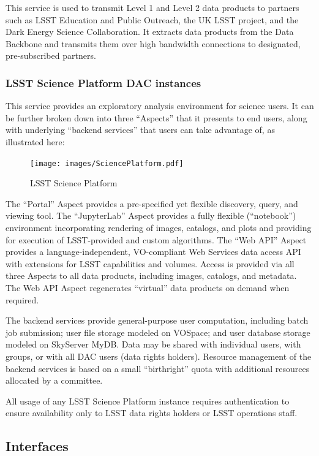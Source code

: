 \documentclass[DM,lsstdraft,toc]{lsstdoc}
\begin{document}
This service is used to transmit Level 1 and Level 2 data products to
partners such as LSST Education and Public Outreach, the UK LSST
project, and the Dark Energy Science Collaboration. It extracts data
products from the Data Backbone and transmits them over high bandwidth
connections to designated, pre-subscribed partners.

\subsubsection{LSST Science Platform DAC
instances}\label{lsst-science-platform-dac-instances}

This service provides an exploratory analysis environment for science
users. It can be further broken down into three ``Aspects'' that it
presents to end users, along with underlying ``backend services'' that
users can take advantage of, as illustrated here:

\begin{figure}
\centering
\texttt{[image: images/SciencePlatform.pdf]}
\caption{LSST Science Platform}
\end{figure}

The ``Portal'' Aspect provides a pre-specified yet flexible discovery,
query, and viewing tool. The ``JupyterLab'' Aspect provides a fully
flexible (``notebook'') environment incorporating rendering of images,
catalogs, and plots and providing for execution of LSST-provided and
custom algorithms. The ``Web API'' Aspect provides a
language-independent, VO-compliant Web Services data access API with
extensions for LSST capabilities and volumes. Access is provided via all
three Aspects to all data products, including images, catalogs, and
metadata. The Web API Aspect regenerates ``virtual'' data products on
demand when required.

The backend services provide general-purpose user computation, including
batch job submission; user file storage modeled on VOSpace; and user
database storage modeled on SkyServer MyDB. Data may be shared with
individual users, with groups, or with all DAC users (data rights
holders). Resource management of the backend services is based on a
small ``birthright'' quota with additional resources allocated by a
committee.

All usage of any LSST Science Platform instance requires authentication
to ensure availability only to LSST data rights holders or LSST
operations staff.

\subsection{Interfaces}\label{interfaces-3}
\end{document}
